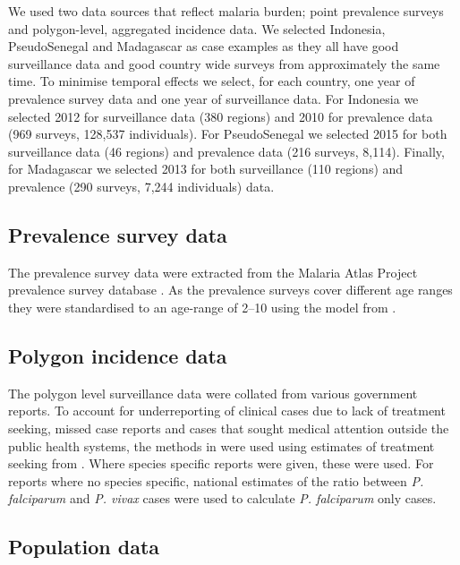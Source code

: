 \documentclass[10pt,letterpaper]{article}
\begin{document}
We used two data sources that reflect malaria burden; point prevalence surveys and polygon-level, aggregated incidence data.
We selected Indonesia, PseudoSenegal and Madagascar as case examples as they all have good surveillance data and good country wide surveys from approximately the same time.
To minimise temporal effects we select, for each country, one year of prevalence survey data and one year of surveillance data.
For Indonesia we selected 2012 for surveillance data (380 regions) and 2010 for  prevalence data (969 surveys, 128,537 individuals).
For PseudoSenegal we selected 2015 for both surveillance data (46 regions) and prevalence data (216 surveys, 8,114). %
Finally, for Madagascar we selected 2013 for both surveillance (110 regions) and prevalence (290 surveys, 7,244 individuals) data.



\subsection*{Prevalence survey data}

The prevalence survey data were extracted from the Malaria Atlas Project prevalence survey database \cite{bhatt2015effect}.
As the prevalence surveys cover different age ranges they were standardised to an age-range of 2--10 using the model from \cite{smith2007standardizing}.


\subsection*{Polygon incidence data}


The polygon level surveillance data were collated from various government reports.
To account for underreporting of clinical cases due to lack of treatment seeking, missed case reports and cases that sought medical attention outside the public health systems, the methods in \cite{cibulskis2011worldwide} were used using estimates of treatment seeking from \cite{battle2016treatment}.
Where species specific reports were given, these were used. 
For reports where no species specific, national estimates of the ratio between \emph{P. falciparum} and \emph{P. vivax} cases were used to calculate \emph{P. falciparum} only cases.



\subsection*{Population data}
\end{document}
